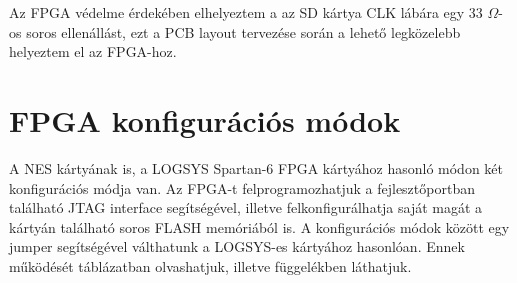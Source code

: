 	Az FPGA védelme érdekében elhelyeztem a az SD kártya CLK lábára egy 33 $\Omega$-os soros ellenállást, ezt a PCB layout tervezése során a lehető legközelebb helyeztem el az FPGA-hoz.  
	
\section{FPGA konfigurációs módok}
	
	A NES kártyának is, a LOGSYS Spartan-6 FPGA kártyához hasonló módon \cite{spatan6} két konfigurációs módja van. Az FPGA-t felprogramozhatjuk a fejlesztőportban található JTAG interface segítségével, illetve felkonfigurálhatja saját magát a kártyán található soros FLASH memóriából is. A konfigurációs módok között egy jumper segítségével válthatunk a LOGSYS-es kártyához hasonlóan. Ennek működését  táblázatban olvashatjuk, illetve  függelékben láthatjuk.       
	
